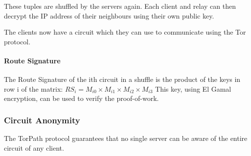 These tuples are shuffled by the servers again. Each client and relay can then 
decrypt the IP address of their neighbours using their own public key.

The clients now have a circuit which they can use to communicate using the Tor 
protocol.

\paragraph{Route Signature}
The Route Signature of the ith circuit in a shuffle is the product of the keys
in row i of the matrix:
$RS_i = M_{i0} \times M_{i1} \times M_{i2} \times M_{i3}$
This key, using El Gamal encryption, can be used to verify the  proof-of-work.

\subsubsection{Circuit Anonymity} 
The TorPath protocol guarantees that no single server can be aware of the entire
circuit of any client. 







